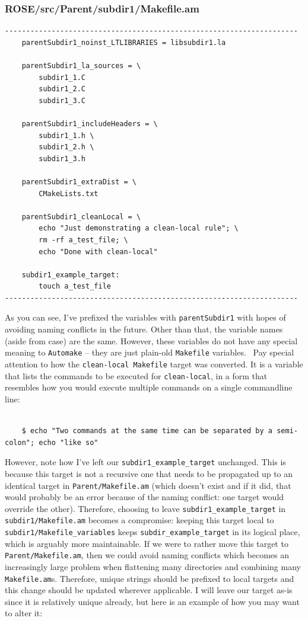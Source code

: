\subsubsection{ROSE/src/Parent/subdir1/Makefile.am}
    \begin{verbatim}
---------------------------------------------------------------------
    parentSubdir1_noinst_LTLIBRARIES = libsubdir1.la

    parentSubdir1_la_sources = \
        subdir1_1.C
        subdir1_2.C
        subdir1_3.C 

    parentSubdir1_includeHeaders = \
        subdir1_1.h \
        subdir1_2.h \
        subdir1_3.h

    parentSubdir1_extraDist = \
        CMakeLists.txt

    parentSubdir1_cleanLocal = \
        echo "Just demonstrating a clean-local rule"; \
        rm -rf a_test_file; \
        echo "Done with clean-local"

    subdir1_example_target:
        touch a_test_file
---------------------------------------------------------------------
    \end{verbatim}
As you can see, I've prefixed the variables with \texttt{parentSubdir1} with hopes of avoiding
naming conflicts in the future. Other than that, the variable names (aside from case) are the
same. However, these variables do not have any special meaning to \texttt{Automake} -- they are
just plain-old \texttt{Makefile} variables.
\newline\newline\
Pay special attention to how the \texttt{clean-local Makefile} target was converted. It is
a variable that lists the commands to be executed for \texttt{clean-local}, in a form that
resembles how you would execute multiple commands on a single commandline line:

    \begin{verbatim}

    $ echo "Two commands at the same time can be separated by a semi-colon"; echo "like so"
    \end{verbatim}
However, note how I've left our \texttt{subdir1\_example\_target} unchanged. This is because
this target is not a recursive one that needs to be propagated up to an identical target in
\texttt{Parent/Makefile.am} (which doesn't exist and if it did, that would probably be an
error because of the naming conflict: one target would override the other). Therefore, choosing
to leave \texttt{subdir1\_example\_target} in \texttt{subdir1/Makefile.am} becomes a compromise:
keeping this target local to \texttt{subdir1/Makefile\_variables} keeps
\texttt{subdir\_example\_target} in its logical place, which is arguably more maintainable. If
we were to rather move this target to \texttt{Parent/Makefile.am}, then we could avoid naming
conflicts which becomes an increasingly large problem when flattening many directories and
combining many \texttt{Makefile.am}s. Therefore, unique strings should be prefixed to local
targets and this change should be updated wherever applicable. I will leave our target as-is
since it is relatively unique already, but here is an example of how you may want to alter it:
